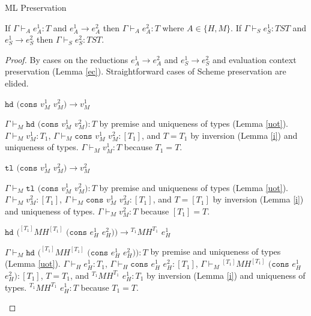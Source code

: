 \begin{theorem}{ML Preservation}

\label{thmpnm}

If $\Gamma\vdash_{A}e_{A}^{1}:T$ and $e_{A}^{1}\rightarrow e_{A}^{2}$ then $\Gamma\vdash_{A}e_{A}^{2}:T$ where $A\in\lbrace H,M\rbrace$.  If $\Gamma\vdash_{S}e_{S}^{1}:TST$ and $e_{S}^{1}\rightarrow e_{S}^{2}$ then $\Gamma\vdash_{S}e_{S}^{2}:TST$.

\begin{proof}

By cases on the reductions $e_{A}^{1}\rightarrow e_{A}^{2}$ and $e_{S}^{1}\rightarrow e_{S}^{2}$ and evaluation context preservation (Lemma \ref{ec}).  Straightforward cases of Scheme preservation are elided.


\begin{case}
$\mathtt{hd}$ $(\mathtt{cons}$ $v_{M}^{1}$ $v_{M}^{2})\rightarrow v_{M}^{1}$

$\Gamma\vdash_{M}\mathtt{hd}$ $(\mathtt{cons}$ $v_{M}^{1}$ $v_{M}^{2}):T$ by premise and uniqueness of types (Lemma \ref{uot}).  $\Gamma\vdash_{M}v_{M}^{1}:T_{1}$, $\Gamma\vdash_{M}\mathtt{cons}$ $v_{M}^{1}$ $v_{M}^{2}:[T_{1}]$, and $T=T_{1}$ by inversion (Lemma \ref{i}) and uniqueness of types.  $\Gamma\vdash_{M}v_{M}^{1}:T$ because $T_{1}=T$.
\end{case}


\begin{case}
$\mathtt{tl}$ $(\mathtt{cons}$ $v_{M}^{1}$ $v_{M}^{2})\rightarrow v_{M}^{2}$

$\Gamma\vdash_{M}\mathtt{tl}$ $(\mathtt{cons}$ $v_{M}^{1}$ $v_{M}^{2}):T$ by premise and uniqueness of types (Lemma \ref{uot}).  $\Gamma\vdash_{M}v_{M}^{2}:[T_{1}]$, $\Gamma\vdash_{M}\mathtt{cons}$ $v_{M}^{1}$ $v_{M}^{2}:[T_{1}]$, and $T=[T_{1}]$ by inversion (Lemma \ref{i}) and uniqueness of types.  $\Gamma\vdash_{M}v_{M}^{2}:T$ because $[T_{1}]=T$.
\end{case}


\begin{case}
$\mathtt{hd}$ $(^{[T_{1}]}MH^{[T_{1}]}$ $(\mathtt{cons}$ $e_{H}^{1}$ $e_{H}^{2}))\rightarrow{^{T_{1}}M}H^{T_{1}}$ $e_{H}^{1}$

$\Gamma\vdash_{M}\mathtt{hd}$ $(^{[T_{1}]}MH^{[T_{1}]}$ $(\mathtt{cons}$ $e_{H}^{1}$ $e_{H}^{2})):T$ by premise and uniqueness of types (Lemma \ref{uot}).  $\Gamma\vdash_{H}e_{H}^{1}:T_{1}$, $\Gamma\vdash_{H}\mathtt{cons}$ $e_{H}^{1}$ $e_{H}^{2}:[T_{1}]$, $\Gamma\vdash_{M}{^{[T_{1}]}M}H^{[T_{1}]}$ $(\mathtt{cons}$ $e_{H}^{1}$ $e_{H}^{2}):[T_{1}]$, $T=T_{1}$, and $^{T_{1}}MH^{T_{1}}$ $e_{H}^{1}:T_{1}$ by inversion (Lemma \ref{i}) and uniqueness of types.  $^{T_{1}}MH^{T_{1}}$ $e_{H}^{1}:T$ because $T_{1}=T$.
\end{case}


\end{proof}
\end{theorem}

